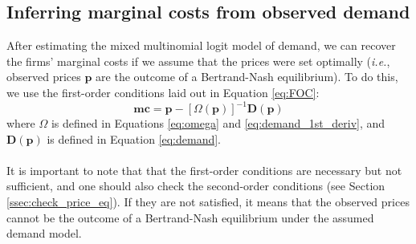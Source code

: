 \documentclass[12pt]{article}
\begin{document}
\subsection{Inferring marginal costs from observed demand}
After estimating the mixed multinomial logit model of demand, we can recover the firms' marginal costs if we assume that the prices were set optimally (\textit{i.e.}, observed prices $\textbf{p}$ are the outcome of a Bertrand-Nash equilibrium). To do this, we use the first-order conditions laid out in Equation \ref{eq:FOC}:
\begin{equation}
	\textbf{mc} = \textbf{p} - \left[\Omega(\textbf{p})\right]^{-1} \textbf{D}(\textbf{p})
\end{equation}
where $\Omega$ is defined in Equations \ref{eq:omega} and \ref{eq:demand_1st_deriv}, and $\textbf{D}(\textbf{p})$ is defined in Equation \ref{eq:demand}.\\
\\
It is important to note that that the first-order conditions are necessary but not sufficient, and one should also check the second-order conditions (see Section \ref{ssec:check_price_eq}). If they are not satisfied, it means that the observed prices cannot be the outcome of a Bertrand-Nash equilibrium under the assumed demand model.
\end{document}
